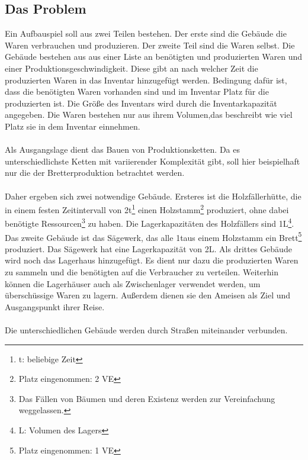 \documentclass[12pt]{article}
\begin{document}
\subsection{Das Problem}
Ein Aufbauspiel soll aus zwei Teilen bestehen. Der erste sind die Gebäude die Waren verbrauchen und produzieren. Der zweite Teil sind die Waren selbst. Die Gebäude bestehen aus aus einer Liste an benötigten und produzierten Waren und einer Produktionsgeschwindigkeit. Diese gibt an nach welcher Zeit die produzierten Waren in das Inventar hinzugefügt werden. Bedingung dafür ist, dass die benötigten Waren vorhanden sind und im Inventar Platz für die produzierten ist. Die Größe des Inventars wird durch die Inventarkapazität angegeben.
Die Waren bestehen nur aus ihrem Volumen,das beschreibt wie viel Platz sie in dem Inventar einnehmen.\\\\
Als Ausgangslage dient das Bauen von Produktionsketten. Da es unterschiedlichste Ketten mit variierender Komplexität gibt, soll hier beispielhaft nur die der Bretterproduktion betrachtet werden.\\\\
Daher ergeben sich zwei notwendige Gebäude. Ersteres ist die Holzfällerhütte, die in einem festen Zeitintervall von 2t\footnote{t: beliebige Zeit} einen Holzstamm\footnote{Platz eingenommen: 2 VE} produziert, ohne dabei benötigte Ressourcen\footnote{Das Fällen von Bäumen und deren Existenz werden zur Vereinfachung weggelassen.} zu haben. Die Lagerkapazitäten des Holzfällers sind 1L\footnote{L: Volumen des Lagers}. Das zweite Gebäude ist das Sägewerk, das alle 1t\footnotemark[3] aus einem Holzstamm ein Brett\footnote{Platz eingenommen: 1 VE} produziert. Das Sägewerk hat eine Lagerkapazität von 2L\footnotemark[6]. 
Als drittes Gebäude wird noch das Lagerhaus hinzugefügt. Es dient nur dazu die produzierten Waren zu sammeln und die benötigten auf die Verbraucher zu verteilen. Weiterhin können die Lagerhäuser auch als Zwischenlager verwendet werden, um überschüssige Waren zu lagern. Außerdem dienen sie den Ameisen als Ziel und Ausgangspunkt ihrer Reise.\\\\
Die unterschiedlichen Gebäude werden durch Straßen miteinander verbunden.
\end{document}
